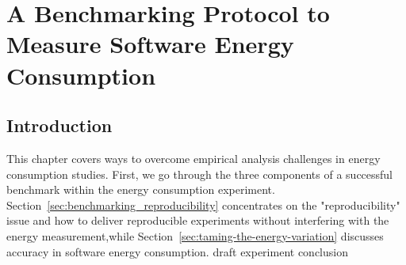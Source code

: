 
\chapter{A Benchmarking Protocol to Measure Software Energy Consumption}\label{chapter:benchmarking}
\section{Introduction  }
This chapter covers ways to overcome empirical analysis challenges in energy consumption studies. First, we go through the three components of a successful benchmark within the energy consumption experiment. Section~\ref{sec:benchmarking_reproducibility} concentrates on the "reproducibility" issue and how to deliver reproducible experiments without interfering with the energy measurement,while Section~\ref{sec:taming-the-energy-variation} discusses accuracy in software energy consumption.
{draft}
{experiment}
{conclusion}


